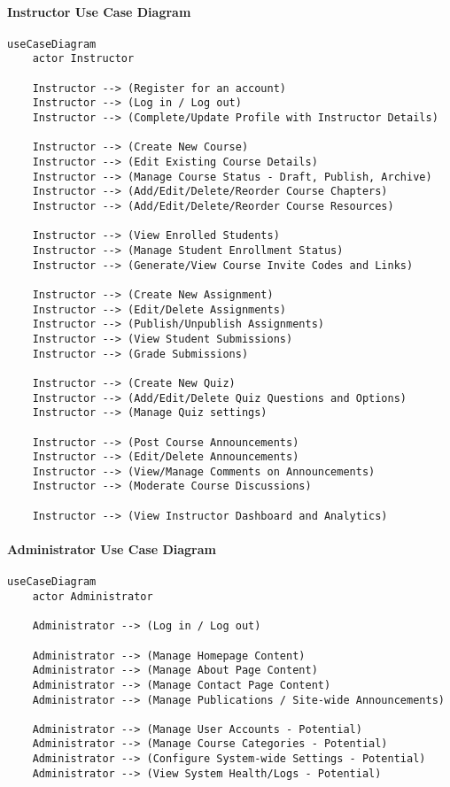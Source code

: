 \paragraph*{Instructor Use Case Diagram}
\begin{verbatim}
useCaseDiagram
    actor Instructor

    Instructor --> (Register for an account)
    Instructor --> (Log in / Log out)
    Instructor --> (Complete/Update Profile with Instructor Details)

    Instructor --> (Create New Course)
    Instructor --> (Edit Existing Course Details)
    Instructor --> (Manage Course Status - Draft, Publish, Archive)
    Instructor --> (Add/Edit/Delete/Reorder Course Chapters)
    Instructor --> (Add/Edit/Delete/Reorder Course Resources)
    
    Instructor --> (View Enrolled Students)
    Instructor --> (Manage Student Enrollment Status)
    Instructor --> (Generate/View Course Invite Codes and Links)

    Instructor --> (Create New Assignment)
    Instructor --> (Edit/Delete Assignments)
    Instructor --> (Publish/Unpublish Assignments)
    Instructor --> (View Student Submissions)
    Instructor --> (Grade Submissions)
    
    Instructor --> (Create New Quiz)
    Instructor --> (Add/Edit/Delete Quiz Questions and Options)
    Instructor --> (Manage Quiz settings)

    Instructor --> (Post Course Announcements)
    Instructor --> (Edit/Delete Announcements)
    Instructor --> (View/Manage Comments on Announcements)
    Instructor --> (Moderate Course Discussions)

    Instructor --> (View Instructor Dashboard and Analytics)
\end{verbatim}

\paragraph*{Administrator Use Case Diagram}
\begin{verbatim}
useCaseDiagram
    actor Administrator

    Administrator --> (Log in / Log out)

    Administrator --> (Manage Homepage Content)
    Administrator --> (Manage About Page Content)
    Administrator --> (Manage Contact Page Content)
    Administrator --> (Manage Publications / Site-wide Announcements)

    Administrator --> (Manage User Accounts - Potential)
    Administrator --> (Manage Course Categories - Potential)
    Administrator --> (Configure System-wide Settings - Potential)
    Administrator --> (View System Health/Logs - Potential)
\end{verbatim}


